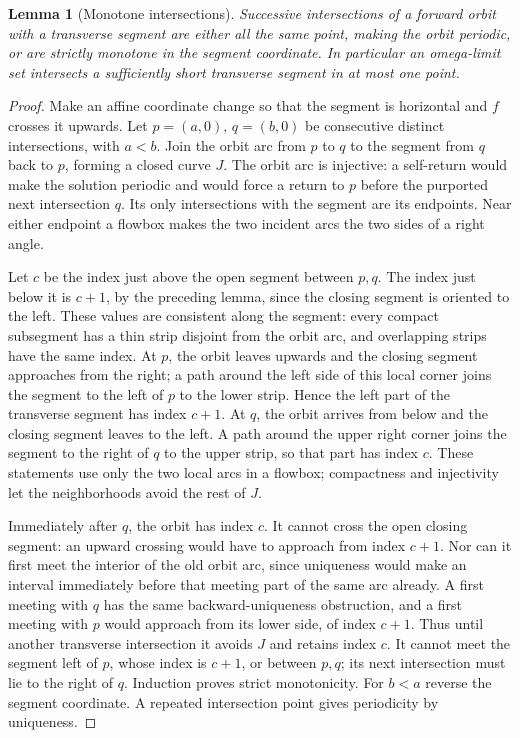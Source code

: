 \documentclass[11pt,oneside]{book}
\newtheorem{lemma}[theorem]{Lemma}
\theoremstyle{definition}
\theoremstyle{remark}\newtheorem{remark}[theorem]{Remark}
\begin{document}
\begin{lemma}[Monotone intersections]\label{d13:13:monotone-crossings}
Successive intersections of a forward orbit with a transverse segment
are either all the same point, making the orbit periodic, or are strictly
monotone in the segment coordinate. In particular an omega-limit set
intersects a sufficiently short transverse segment in at most one point.
\end{lemma}
\begin{proof}
Make an affine coordinate change so that the segment is horizontal
and \(f\) crosses it upwards. Let \(p=(a,0)\), \(q=(b,0)\) be consecutive
distinct intersections, with \(a<b\). Join the orbit arc from \(p\) to
\(q\) to the segment from \(q\) back to \(p\), forming a closed curve \(J\).
The orbit arc is injective: a self-return would make the solution
periodic and would force a return to \(p\) before the purported next
intersection \(q\). Its only intersections with the segment are its
endpoints. Near either endpoint a flowbox makes the two incident arcs
the two sides of a right angle.

Let \(c\) be the index just above the open segment between \(p,q\).
The index just below it is \(c+1\), by the preceding lemma, since the
closing segment is oriented to the left. These values are consistent
along the segment: every compact subsegment has a thin strip disjoint
from the orbit arc, and overlapping strips have the same index.
At \(p\), the orbit leaves upwards and the closing segment approaches
from the right; a path around the left side of this local corner joins
the segment to the left of \(p\) to the lower strip. Hence the left
part of the transverse segment has index \(c+1\).
At \(q\), the orbit arrives from below and the closing segment leaves
to the left. A path around the upper right corner joins the segment
to the right of \(q\) to the upper strip, so that part has index \(c\).
These statements use only the two local arcs in a flowbox; compactness
and injectivity let the neighborhoods avoid the rest of \(J\).

Immediately after \(q\), the orbit has index \(c\). It cannot cross the
open closing segment: an upward crossing would have to approach from
index \(c+1\). Nor can it first meet the interior of the old orbit arc,
since uniqueness would make an interval immediately before that meeting
part of the same arc already. A first meeting with \(q\) has the same
backward-uniqueness obstruction, and a first meeting with \(p\) would
approach from its lower side, of index \(c+1\). Thus until another
transverse intersection it avoids \(J\) and retains index \(c\).
It cannot meet the segment left of \(p\), whose index is \(c+1\), or
between \(p,q\); its next intersection must lie to the right of \(q\).
Induction proves strict monotonicity. For \(b<a\) reverse the segment
coordinate. A repeated intersection point gives periodicity by
uniqueness.


\end{proof}
\end{document}
